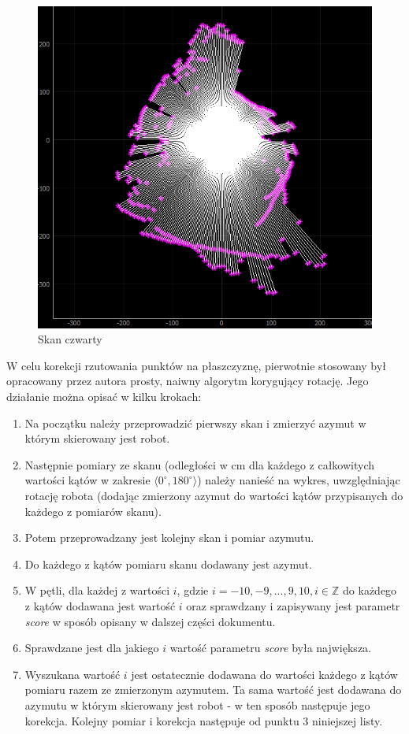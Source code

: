 \begin{figure}[ht]
	\centering
		\includegraphics[width=0.5\linewidth]{rys/ScanBot-12-calibrated-room-map4.PNG}
	\caption{Skan czwarty}
	\label{fig:overlapping-4}
\end{figure}

W celu korekcji rzutowania punktów na płaszczyznę, pierwotnie stosowany był opracowany przez autora prosty, naiwny algorytm korygujący rotację. Jego działanie można opisać w kilku krokach:
\begin{enumerate}
    \item Na początku należy przeprowadzić pierwszy skan i zmierzyć azymut w którym skierowany jest robot.
    \item Następnie pomiary ze skanu (odległości w cm dla każdego z całkowitych wartości kątów w zakresie $\langle0^{\circ}, 180^{\circ}\rangle$) należy nanieść na wykres, uwzględniając rotację robota (dodając zmierzony azymut do wartości kątów przypisanych do każdego z pomiarów skanu).
    \item Potem przeprowadzany jest kolejny skan i pomiar azymutu.
    \item Do każdego z kątów pomiaru skanu dodawany jest azymut.
    \item W pętli, dla każdej z wartości $i$, gdzie $i={-10,-9,...,9,10}, i \in \mathbb{Z}$ do każdego z kątów dodawana jest wartość $i$ oraz sprawdzany i zapisywany jest parametr \emph{score} w sposób opisany w dalszej części dokumentu.
    \item Sprawdzane jest dla jakiego $i$ wartość parametru \emph{score} była największa. 
    \item Wyszukana wartość $i$ jest ostatecznie dodawana do wartości każdego z kątów pomiaru razem ze zmierzonym azymutem. Ta sama wartość jest dodawana do azymutu w którym skierowany jest robot - w ten sposób następuje jego korekcja. Kolejny pomiar i korekcja następuje od punktu 3 niniejszej listy.
\end{enumerate}

